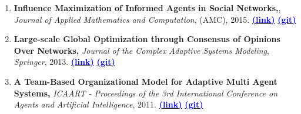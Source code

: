 \documentclass[letter]{res}
\begin{document}
\begin{resume}
\begin{enumerate}[leftmargin=-.01in]
			\item \textbf{Influence Maximization of Informed Agents in Social Networks,}, \textit{Journal of Applied Mathematics and Computation}, (AMC), 2015.
			{\href{http://dx.doi.org/10.1016/j.amc.2014.12.139}{\textbf{\textcolor{blue}{(link)}}}}
			{\href{https://github.com/omid55/influence_maximization}{\textbf{\textcolor{blue}{(git)}}}}
			
			\item \textbf{Large-scale Global Optimization through Consensus of Opinions Over Networks,} \textit{Journal of the Complex Adaptive Systems Modeling}, \textit{Springer}, 2013.
			{\href{http://www.casmodeling.com/content/1/1/11}{\textbf{\textcolor{blue}{(link)}}}}
			{\href{https://github.com/omid55/optimization_opinion_formation}{\textbf{\textcolor{blue}{(git)}}}}
			
			
			\item \textbf{A Team-Based Organizational Model for Adaptive Multi Agent Systems,} \textit{ICAART - Proceedings of the 3rd International Conference on Agents and Artificial Intelligence}, 2011.
			{\href{https://www.researchgate.net/publication/221539731_A_Team-based_Organizational_Model_for_Adaptive_Multi-agent_Systems}{\textbf{\textcolor{blue}{(link)}}}}
			{\href{https://github.com/omid55/team_based_rescue_jade_multi_agent_system}{\textbf{\textcolor{blue}{(git)}}}}
			

\end{enumerate}
\end{resume}
\end{document}
